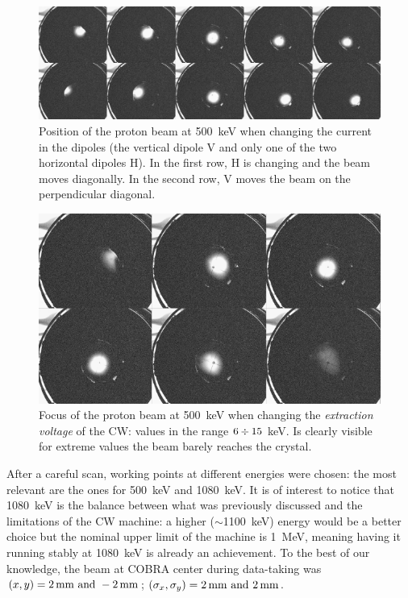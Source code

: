\begin{refsection}
        \begin{figure}
            \centering
            \includegraphics[width = \textwidth]{Figures/X17/beamtuning/psotion_500keV.png}
            \caption{Position of the proton beam at \SI{500}{keV} when changing the current in the dipoles (the vertical dipole V and only one of the two horizontal dipoles H). In the first row, H is changing and the beam moves diagonally. In the second row, V moves the beam on the perpendicular diagonal.}
            \label{fig:position_500keV}
        \end{figure}
        \begin{figure}
            \centering
            \includegraphics[width = \textwidth]{Figures/X17/beamtuning/focus_500keV.png}
            \caption{Focus of the proton beam at \SI{500}{keV} when changing the \textit{extraction voltage} of the CW: values in the range $6\divisionsymbol15$ keV. Is clearly visible for extreme values the beam barely reaches the crystal.}
            \label{fig:focus_500keV}
        \end{figure}
        \noindent
        After a careful scan, working points at different energies were chosen: the most relevant are the ones for \SI{500}{keV} and \SI{1080}{keV}.
        It is of interest to notice that \SI{1080}{keV} is the balance between what was previously discussed and the limitations of the CW machine: a higher ($\sim$\SI{1100}{keV}) energy would be a better choice but the nominal upper limit of the machine is \SI{1}{MeV}, meaning having it running stably at \SI{1080}{keV} is already an achievement.
        To the best of our knowledge, the beam at COBRA center during data-taking was $(x, y) = \SIlist{2; -2}{mm}$; $(\sigma_x, \sigma_y) = \SIlist{2; 2}{mm}$.\\


\end{refsection}
